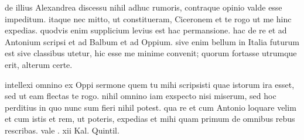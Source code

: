 


 de illius Alexandrea discessu nihil adhuc rumoris, contraque opinio valde esse impeditum. itaque nec mitto, ut constitueram, Ciceronem et te rogo ut me hinc expedias. quodvis enim supplicium levius est hac permansione. hac de re et ad Antonium scripsi et ad Balbum et ad Oppium. sive enim bellum in Italia futurum est sive classibus utetur, hic esse me minime convenit; quorum fortasse utrumque erit, alterum certe.

 intellexi omnino ex Oppi sermone quem tu mihi scripsisti quae istorum ira esset, sed ut eam flectas te rogo. nihil omnino iam exspecto nisi miserum, sed hoc perditius in quo nunc sum fieri nihil potest. qua re et cum Antonio loquare velim et cum istis et rem, ut poteris, expedias et mihi quam primum de omnibus rebus rescribas. vale . xii Kal. Quintil.
